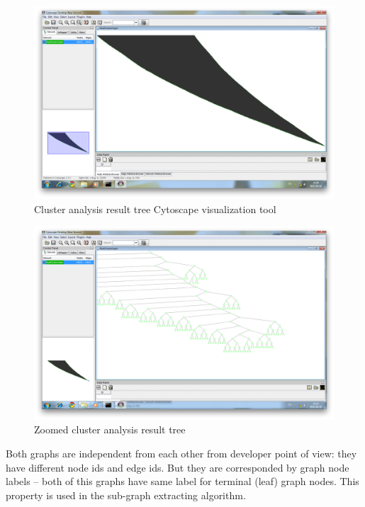 \begin{figure}[h!]
\centering
\includegraphics[scale=0.25]{pictures/Cytoscape_cluster_graph_1.png}
\caption{Cluster analysis result tree Cytoscape visualization tool}
\label{fig:Cytoscape_Cluster_1}
\end{figure}

\begin{figure}[h!]
\centering
\includegraphics[scale=0.25]{pictures/Cytoscape_cluster_graph_2.png}
\caption{Zoomed cluster analysis result tree}
\label{fig:Cytoscape_Cluster_2}
\end{figure}

Both graphs are independent from each other from developer point of view: they have different node ids and edge ids. But they are corresponded by graph node labels -- both of this graphs have same label for terminal (leaf) graph nodes. This property is used in the sub-graph extracting algorithm.



